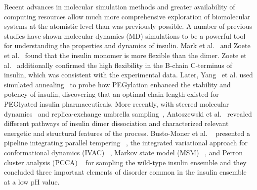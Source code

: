 \documentclass[sn-vancouver]{sn-jnl}
\begin{document}
Recent advances in molecular simulation methods and greater availability of computing resources allow much more comprehensive exploration of biomolecular systems at the atomistic level than was previously possible. A number of previous studies have shown molecular dynamics (MD) simulations to be a powerful tool for understanding the properties and dynamics of insulin. Mark et al.~\cite{mark1991conformational} and Zoete et al.~\cite{zoete2004comparison} found that the insulin monomer is more flexible than the dimer. Zoete et al.~\cite{zoete2004comparison} additionally confirmed the high flexibility in the B-chain C-terminus of insulin, which was consistent with the experimental data. Later, Yang~\cite{yang2011pegylation} et al. used simulated annealing~\cite{pincus1970letter} to probe how PEGylation enhanced the stability and potency of insulin, discovering that an optimal chain length existed for PEGlyated insulin pharmaceuticals. More recently, with steered molecular dynamics~\cite{isralewitz2001steered} and replica-exchange umbrella sampling~\cite{sugita2000multidimensional}, Antoszewski et al.~\cite{antoszewski2020insulin} revealed different pathways of insulin dimer dissociation and characterized relevant energetic and structural features of the process. Busto-Moner et al. ~\cite{busto2021structural} presented a pipeline integrating parallel tempering ~\cite{hansmann1997parallel, earl2005parallel}, the integrated variational approach for conformational dynamics (IVAC) ~\cite{nuske2014variational, lorpaiboon2020integrated}, Markov state model (MSM) ~\cite{prinz2011markov, bowman2013introduction}, and Perron cluster analysis (PCCA) ~\cite{schutte1999direct} for sampling the wild-type insulin ensemble and they concluded three important elements of disorder common in the insulin ensemble at a low pH value.
\end{document}
